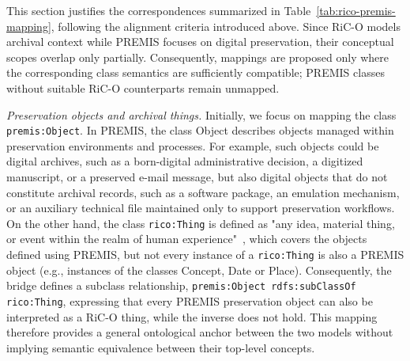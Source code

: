 \documentclass[runningheads]{llncs}
\begin{document}
This section justifies the correspondences summarized in
Table~\ref{tab:rico-premis-mapping}, following the alignment
criteria introduced above. Since RiC-O models archival context
while PREMIS focuses on digital preservation, their conceptual
scopes overlap only partially. Consequently, mappings are
proposed only where the corresponding class semantics are
sufficiently compatible; PREMIS classes without suitable
RiC-O counterparts remain unmapped.



\emph{Preservation objects and archival things.} Initially, we focus on mapping the class \texttt{premis:Object}. In PREMIS, the class Object describes objects managed within preservation environments and processes. For example, such objects could be digital archives, such as a born-digital administrative decision, a digitized manuscript, or a preserved e-mail message, but also digital objects that do not constitute archival records, such as a software package, an emulation mechanism, or an auxiliary technical file maintained only to support preservation workflows. On the other hand, the class \texttt{rico:Thing} is defined as "any idea, material thing, or event within the realm of human experience"~\cite{RICCM}, which covers the objects defined using PREMIS, but not every instance of a \texttt{rico:Thing} is also a PREMIS object (e.g., instances of the classes Concept, Date or Place). Consequently, the bridge defines a subclass relationship, \texttt{premis:Object rdfs:subClassOf rico:Thing}, expressing that every PREMIS preservation object can also be interpreted as a RiC-O thing, while the inverse does not hold. This mapping therefore provides a general ontological anchor between the two models without implying semantic equivalence between their top-level concepts.
\end{document}
